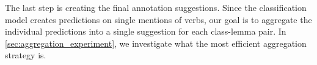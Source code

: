 The last step is creating the final annotation suggestions. Since the classification model creates predictions on single mentions of verbs, our goal is to aggregate the individual predictions into a single suggestion for each class-lemma pair. In \cref{sec:aggregation_experiment}, we investigate what the most efficient aggregation strategy is.